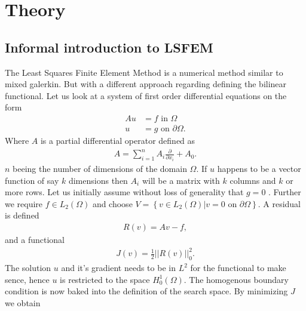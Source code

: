 
\chapter{Theory} %

\label{chap:theory} %



\section{Informal introduction to LSFEM}
The Least Squares Finite Element Method is a numerical method similar to mixed galerkin. But with a different approach regarding defining the bilinear functional. Let us look at a system of first order differential equations on the form 
\begin{align}
	Au &= f \text{ in } \Omega \\
	u &= g \text{ on } \partial \Omega.
	\label{eq:PDE}
\end{align}
Where $A$ is a partial differential operator defined as 
\begin{align}
	A = \sum_{i = 1}^{n} A_i\frac{\partial}{\partial x_i} + A_0.
	\label{def:operatorA}
\end{align}
	$n$ beeing the number of dimensions of the domain $\Omega$. If $u$ happens to be a vector function of say $k$ dimensions then $A_i$ will be a matrix with $k$ columns and $k$ or more rows. Let us initially assume without loss of generality that $g=0$ . Further we require $f \in L_2(\Omega)$ and choose $V = \left\{ v\in L_2(\Omega) | v = 0 \text{ on } \partial \Omega \right\}$. A residual is defined
\begin{align}
	R(v) = Av-f,
	\label{eq:Residual}
\end{align}
and a functional
\begin{align}
	 J(v) = \frac{1}{2}||R(v)||^2_0.
	\label{eq:Functional}
\end{align} 
The solution $u$ and it's gradient needs to be in $L^2$ for the functional to make sence, hence $u$ is restricted to the space $H^1_0(\Omega)$. The homogenous boundary condition is now baked into the definition of the search space. By minimizing $J$ we obtain 
